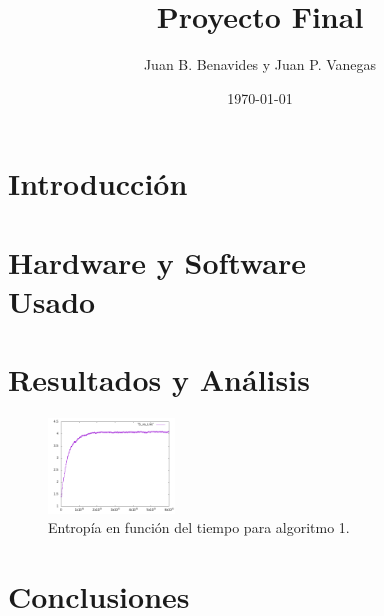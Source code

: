 \documentclass[12pt,twocolumn]{article}
\title{Proyecto Final}
\author{Juan B. Benavides y Juan P. Vanegas }
\date{\today}
\begin{document}
\maketitle

\section{\label{sec: Intro} Introducción}

\section{Hardware y Software \\ Usado}

\section{Resultados y Análisis}

\begin{figure}
    \centering
    \includegraphics[width=0.3\textwidth]{figs/S_vs_t_OOP_all.png}
    \caption{Entropía en función del tiempo para algoritmo 1.}
    \label{fig:s_vs_t}
\end{figure}

\section{Conclusiones}
\end{document}
